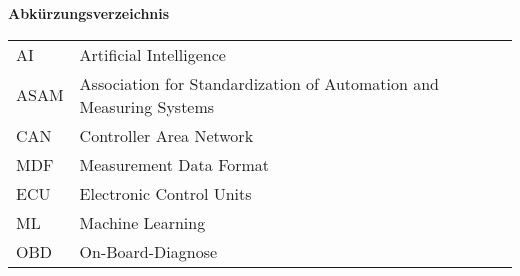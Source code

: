 %
%
%
%
%

\noindent
{\Large\bfseries Abkürzungsverzeichnis}
\vspace{0.65cm}

\begin{table*}[htbp]
		\begin{tabular}{ll}
			AI & Artificial Intelligence \\
			ASAM & Association for Standardization of Automation and Measuring Systems \\
			CAN & Controller Area Network \\
			MDF & Measurement Data Format \\
			ECU & Electronic Control Units \\
			ML & Machine Learning \\
			OBD & On-Board-Diagnose \\
		\end{tabular}
\end{table*}